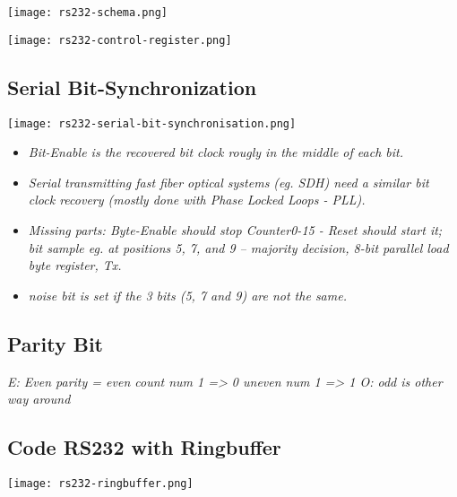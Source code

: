 \texttt{[image: rs232-schema.png]}

\texttt{[image: rs232-control-register.png]}

\subsection{Serial Bit-Synchronization}

\texttt{[image: rs232-serial-bit-synchronisation.png]}

\begin{itemize}
    \item{\textit{
        Bit-Enable is the recovered bit clock rougly in the middle of each bit.
    }}
    \item{\textit{
        Serial transmitting fast fiber optical systems (eg. SDH) need a similar bit
        clock recovery (mostly done with Phase Locked Loops - PLL).
    }}
    \item{\textit{
        Missing parts: Byte-Enable should stop Counter0-15 - Reset should start it;
        bit sample eg. at positions 5, 7, and 9 – majority decision, 8-bit parallel
        load byte register, Tx.
    }}
    \item{\textit{
        noise bit is set if the 3 bits (5, 7 and 9) are not the same.
    }}
\end{itemize}

\subsection{Parity Bit}

\textit{
    E: Even parity = even count num 1 => 0 uneven num 1 => 1
    \newline
    O: odd is other way around
}

\subsection{Code RS232 with Ringbuffer}

\texttt{[image: rs232-ringbuffer.png]}

